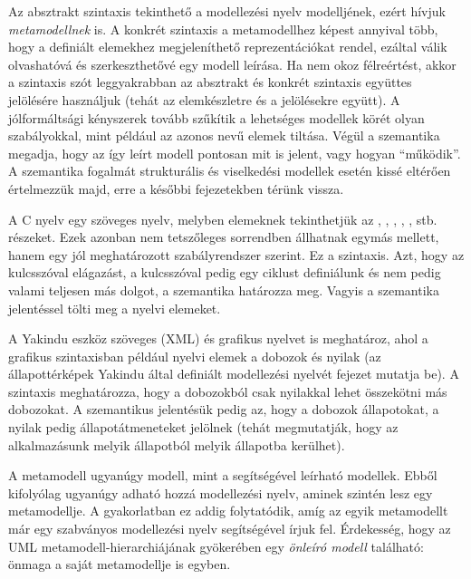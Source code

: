 Az absztrakt szintaxis tekinthető a modellezési nyelv modelljének, ezért hívjuk \emph{metamodellnek} is. A konkrét szintaxis a metamodellhez képest annyival több, hogy a definiált elemekhez megjeleníthető reprezentációkat rendel, ezáltal válik olvashatóvá és szerkeszthetővé egy modell leírása. Ha nem okoz félreértést, akkor a szintaxis szót leggyakrabban az absztrakt és konkrét szintaxis együttes jelölésére használjuk (tehát az elemkészletre és a jelölésekre együtt). A jólformáltsági kényszerek tovább szűkítik a lehetséges modellek körét olyan szabályokkal, mint például az azonos nevű elemek tiltása. Végül a szemantika megadja, hogy az így leírt modell pontosan mit is jelent, vagy hogyan ``működik''. A szemantika fogalmát strukturális és viselkedési modellek esetén kissé eltérően értelmezzük majd, erre a későbbi fejezetekben térünk vissza.

\begin{pelda}
	A C nyelv egy szöveges nyelv, melyben elemeknek tekinthetjük az , , , , ,  stb. részeket. Ezek azonban nem tetszőleges sorrendben állhatnak egymás mellett, hanem egy jól meghatározott szabályrendszer szerint. Ez a szintaxis. Azt, hogy az  kulcsszóval elágazást, a  kulcsszóval pedig egy ciklust definiálunk és nem pedig valami teljesen más dolgot, a szemantika határozza meg. Vagyis a szemantika jelentéssel tölti meg a nyelvi elemeket.
	
	A Yakindu eszköz szöveges (XML) és grafikus nyelvet is meghatároz, ahol a grafikus szintaxisban például nyelvi elemek a dobozok és nyilak (az állapottérképek Yakindu által definiált modellezési nyelvét   fejezet mutatja be). A szintaxis meghatározza, hogy a dobozokból csak nyilakkal lehet összekötni más dobozokat. A szemantikus jelentésük pedig az, hogy a dobozok állapotokat, a nyilak pedig állapotátmeneteket jelölnek (tehát megmutatják, hogy az alkalmazásunk melyik állapotból melyik állapotba kerülhet).
\end{pelda}

\begin{megjegyzes}
	A metamodell ugyanúgy modell, mint a segítségével leírható modellek. Ebből kifolyólag ugyanúgy adható hozzá modellezési nyelv, aminek szintén lesz egy metamodellje. A gyakorlatban ez addig folytatódik, amíg az egyik metamodellt már egy szabványos modellezési nyelv segítségével írjuk fel. Érdekesség, hogy az UML metamodell-hierarchiájának gyökerében egy \emph{önleíró modell} található: önmaga a saját metamodellje is egyben.
\end{megjegyzes}

